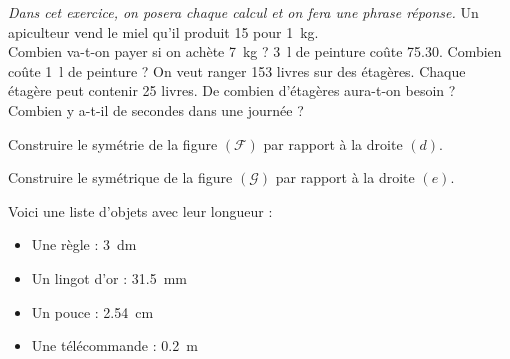 \documentclass[../Cours.tex]{subfiles}
\begin{document}
\begin{questions}
    \textit{Dans cet exercice, on posera chaque calcul et on fera une phrase réponse.}
    \question Un apiculteur vend le miel qu'il produit \qty{15}{\EURO} pour \qty{1}{\kilo\gram}.\\ Combien va-t-on payer si on achète \qty{7}{\kilo\gram} ? 
    \question \qty{3}{\litre} de peinture coûte \qty{75,30}{\EURO}. Combien coûte \qty{1}{\litre} de peinture ? 
    \question On veut ranger 153 livres sur des étagères. Chaque étagère peut contenir 25 livres. De combien d'étagères aura-t-on besoin ? 
    \question Combien y a-t-il de secondes dans une journée ? 

    \question Construire le symétrie de la figure $(\mathcal{F})$ par rapport à la droite $(d)$.
    \begin{center}
    \end{center}

    \clearpage 
    \question Construire le symétrique de la figure $(\mathcal{G})$ par rapport à la droite $(e)$.
    \begin{center}
    \end{center}

    Voici une liste d'objets avec leur longueur :
    \begin{itemize}
        \item Une règle : \qty{3}{\deci\metre}
        \item Un lingot d'or : \qty{31,5}{\milli\metre}
        \item Un pouce : \qty{2,54}{\centi\metre}
        \item Une télécommande : \qty{0,2}{\metre}
    \end{itemize}


\end{questions}
\end{document}
